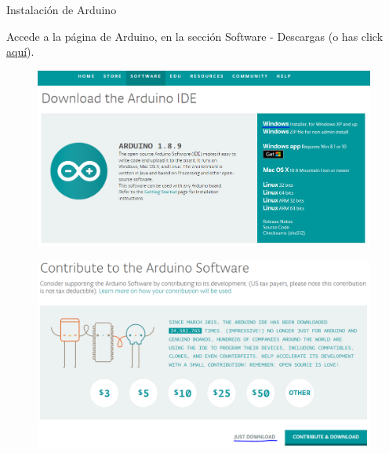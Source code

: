 \begin{frame}[allowframebreaks]{Instalaci\'on de Arduino}\vspace{10pt}

Accede a la p\'agina de Arduino, en la secci\'on Software - Descargas (o has click \href{https://www.arduino.cc/en/Main/Donate}{\color{blue}aqu\'i}).

\begin{figure}
	\centering
	\includegraphics[scale=0.5]{Images/ins1.PNG}
\end{figure}

\begin{figure}
	\centering
	\includegraphics[scale=0.5]{Images/ins2.PNG}
\end{figure}


\end{frame}
